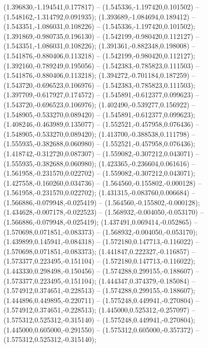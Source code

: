  (1.396830,-1.194541,0.177817) -- (1.545336,-1.197420,0.101502) -- (1.548162,-1.314792,0.091935);
 (1.393689,-1.084694,0.189412) -- (1.543351,-1.086031,0.108226) -- (1.545336,-1.197420,0.101502);
 (1.391869,-0.980735,0.196130) -- (1.542199,-0.980420,0.112127) -- (1.543351,-1.086031,0.108226);
 (1.391361,-0.882348,0.198008) -- (1.541876,-0.880406,0.113218) -- (1.542199,-0.980420,0.112127);
 (1.392160,-0.789249,0.195056) -- (1.542383,-0.785823,0.111503) -- (1.541876,-0.880406,0.113218);
 (1.394272,-0.701184,0.187259) -- (1.543720,-0.696523,0.106976) -- (1.542383,-0.785823,0.111503);
 (1.397709,-0.617927,0.174572) -- (1.545891,-0.612377,0.099623) -- (1.543720,-0.696523,0.106976);
 (1.402490,-0.539277,0.156922) -- (1.548905,-0.533270,0.089420) -- (1.545891,-0.612377,0.099623);
 (1.408246,-0.463989,0.135077) -- (1.552521,-0.457958,0.076436) -- (1.548905,-0.533270,0.089420);
 (1.413700,-0.388538,0.111798) -- (1.555935,-0.382688,0.060980) -- (1.552521,-0.457958,0.076436);
 (1.418742,-0.312720,0.087307) -- (1.559082,-0.307212,0.043071) -- (1.555935,-0.382688,0.060980);
 (1.423365,-0.236604,0.061616) -- (1.561958,-0.231570,0.022702) -- (1.559082,-0.307212,0.043071);
 (1.427558,-0.160260,0.034736) -- (1.564560,-0.155802,-0.000128) -- (1.561958,-0.231570,0.022702);
 (1.431315,-0.083760,0.006684) -- (1.566886,-0.079948,-0.025419) -- (1.564560,-0.155802,-0.000128);
 (1.434628,-0.007178,-0.022523) -- (1.568932,-0.004050,-0.053170) -- (1.566886,-0.079948,-0.025419);
 (1.437491,0.069414,-0.052865) -- (1.570698,0.071851,-0.083373) -- (1.568932,-0.004050,-0.053170);
 (1.439899,0.145941,-0.084318) -- (1.572180,0.147713,-0.116022) -- (1.570698,0.071851,-0.083373);
 (1.441847,0.222327,-0.116857) -- (1.573377,0.223495,-0.151104) -- (1.572180,0.147713,-0.116022);
 (1.443330,0.298498,-0.150456) -- (1.574288,0.299155,-0.188607) -- (1.573377,0.223495,-0.151104);
 (1.444347,0.374379,-0.185084) -- (1.574912,0.374651,-0.228513) -- (1.574288,0.299155,-0.188607);
 (1.444896,0.449895,-0.220711) -- (1.575248,0.449941,-0.270804) -- (1.574912,0.374651,-0.228513);
 (1.445000,0.525312,-0.257097) -- (1.575312,0.525312,-0.315140) -- (1.575248,0.449941,-0.270804);
 (1.445000,0.605000,-0.291550) -- (1.575312,0.605000,-0.357372) -- (1.575312,0.525312,-0.315140);
